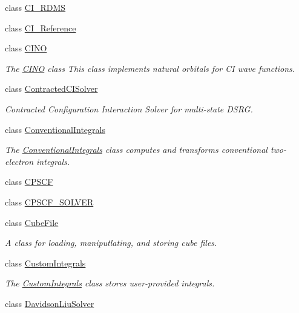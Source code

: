 \begin{DoxyCompactItemize}
class \mbox{\hyperlink{classforte_1_1_c_i___r_d_m_s}{C\+I\+\_\+\+R\+D\+MS}}
\item 
class \mbox{\hyperlink{classforte_1_1_c_i___reference}{C\+I\+\_\+\+Reference}}
\item 
class \mbox{\hyperlink{classforte_1_1_c_i_n_o}{C\+I\+NO}}
\begin{DoxyCompactList}\small\item\em The \mbox{\hyperlink{classforte_1_1_c_i_n_o}{C\+I\+NO}} class This class implements natural orbitals for CI wave functions. \end{DoxyCompactList}\item 
class \mbox{\hyperlink{classforte_1_1_contracted_c_i_solver}{Contracted\+C\+I\+Solver}}
\begin{DoxyCompactList}\small\item\em Contracted Configuration Interaction Solver for multi-\/state D\+S\+RG. \end{DoxyCompactList}\item 
class \mbox{\hyperlink{classforte_1_1_conventional_integrals}{Conventional\+Integrals}}
\begin{DoxyCompactList}\small\item\em The \mbox{\hyperlink{classforte_1_1_conventional_integrals}{Conventional\+Integrals}} class computes and transforms conventional two-\/electron integrals. \end{DoxyCompactList}\item 
class \mbox{\hyperlink{classforte_1_1_c_p_s_c_f}{C\+P\+S\+CF}}
\item 
class \mbox{\hyperlink{classforte_1_1_c_p_s_c_f___s_o_l_v_e_r}{C\+P\+S\+C\+F\+\_\+\+S\+O\+L\+V\+ER}}
\item 
class \mbox{\hyperlink{classforte_1_1_cube_file}{Cube\+File}}
\begin{DoxyCompactList}\small\item\em A class for loading, maniputlating, and storing cube files. \end{DoxyCompactList}\item 
class \mbox{\hyperlink{classforte_1_1_custom_integrals}{Custom\+Integrals}}
\begin{DoxyCompactList}\small\item\em The \mbox{\hyperlink{classforte_1_1_custom_integrals}{Custom\+Integrals}} class stores user-\/provided integrals. \end{DoxyCompactList}\item 
class \mbox{\hyperlink{classforte_1_1_davidson_liu_solver}{Davidson\+Liu\+Solver}}

\end{DoxyCompactItemize}
